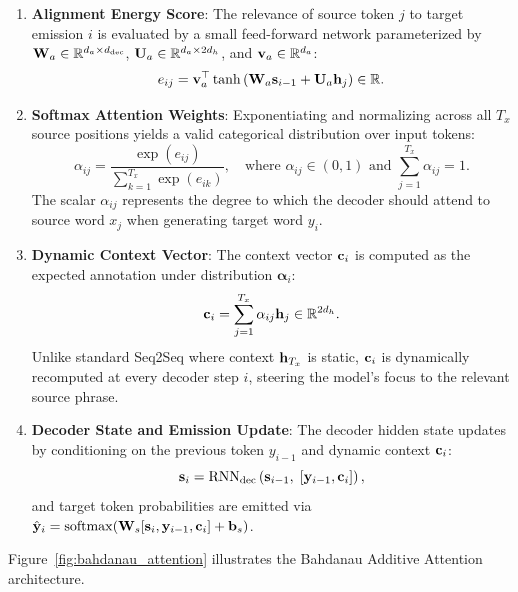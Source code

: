 \documentclass[../../main.tex]{subfiles}
\begin{document}
\begin{enumerate}
    \item \textbf{Alignment Energy Score}: The relevance of source token $j$ to target emission $i$ is evaluated by a small feed-forward network parameterized by $\mathbf{W}_a \in \mathbb{R}^{d_a \times d_{\text{dec}}}$, $\mathbf{U}_a \in \mathbb{R}^{d_a \times 2d_h}$, and $\mathbf{v}_a \in \mathbb{R}^{d_a}$:
    \begin{equation}
    \label{eq:rnn_bahdanau_score}
    e_{ij} = \mathbf{v}_a^\top \tanh\left( \mathbf{W}_a \mathbf{s}_{i-1} + \mathbf{U}_a \mathbf{h}_j \right) \in \mathbb{R}.
    \end{equation}
    \item \textbf{Softmax Attention Weights}: Exponentiating and normalizing across all $T_x$ source positions yields a valid categorical distribution over input tokens:
    \begin{equation}
    \label{eq:rnn_bahdanau_weights}
    \alpha_{ij} = \frac{\exp(e_{ij})}{\sum_{k=1}^{T_x} \exp(e_{ik})}, \quad \text{where } \alpha_{ij} \in (0, 1) \text{ and } \sum_{j=1}^{T_x} \alpha_{ij} = 1.
    \end{equation}
    The scalar $\alpha_{ij}$ represents the degree to which the decoder should attend to source word $x_j$ when generating target word $y_i$.
    \item \textbf{Dynamic Context Vector}: The context vector $\mathbf{c}_i$ is computed as the expected annotation under distribution $\boldsymbol{\alpha}_i$:
    \begin{equation}
    \label{eq:rnn_bahdanau_context}
    \mathbf{c}_i = \sum_{j=1}^{T_x} \alpha_{ij} \mathbf{h}_j \in \mathbb{R}^{2d_h}.
    \end{equation}
    Unlike standard Seq2Seq where context $\mathbf{h}_{T_x}$ is static, $\mathbf{c}_i$ is dynamically recomputed at every decoder step $i$, steering the model's focus to the relevant source phrase.
    \item \textbf{Decoder State and Emission Update}: The decoder hidden state updates by conditioning on the previous token $y_{i-1}$ and dynamic context $\mathbf{c}_i$:
    \begin{equation}
    \label{eq:rnn_bahdanau_decoder_update}
    \mathbf{s}_i = \operatorname{RNN}_{\text{dec}}\left( \mathbf{s}_{i-1}, \; [\mathbf{y}_{i-1}, \mathbf{c}_i] \right),
    \end{equation}
    and target token probabilities are emitted via $\hat{\mathbf{y}}_i = \operatorname{\mathrm{softmax}}(\mathbf{W}_s [\mathbf{s}_i, \mathbf{y}_{i-1}, \mathbf{c}_i] + \mathbf{b}_s)$.
\end{enumerate}

Figure~\ref{fig:bahdanau_attention} illustrates the Bahdanau Additive Attention architecture.
\end{document}
